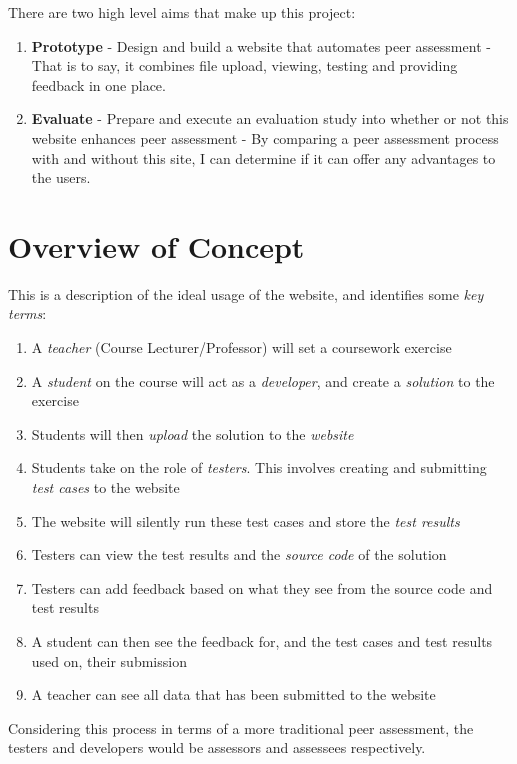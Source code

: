 \documentclass[a4paper,11pt]{report}
\begin{document}
There are two high level aims that make up this project:
\begin{enumerate}
\item \textbf{Prototype} - Design and build a website that automates peer assessment - That is to say, it combines file upload, viewing, testing and providing feedback in one place.
\item \textbf{Evaluate} - Prepare and execute an evaluation study into whether or not this website enhances peer assessment - By comparing a peer assessment process with and without this site, I can determine if it can offer any advantages to the users.
\end{enumerate}

\newpage
\section{Overview of Concept}
This is a description of the ideal usage of the website, and identifies some \textit{key terms}:
\begin{enumerate}
 \item A \textit{teacher} (Course Lecturer/Professor) will set a coursework exercise
 \item A \textit{student} on the course will act as a \textit{developer}, and create a \textit{solution} to the exercise
 \item Students will then \textit{upload} the solution to the \textit{website}
 \item Students take on the role of \textit{testers}. This involves creating and submitting \textit{test cases} to the website
 \item The website will silently run these test cases and store the \textit{test results}
 \item Testers can view the test results and the \textit{source code} of the solution
 \item Testers can add feedback based on what they see from the source code and test results
 \item A student can then see the feedback for, and the test cases and test results used on, their submission
 \item A teacher can see all data that has been submitted to the website 
\end{enumerate}
Considering this process in terms of a more traditional peer assessment, the testers and developers would be assessors and assessees respectively.



\end{document}
